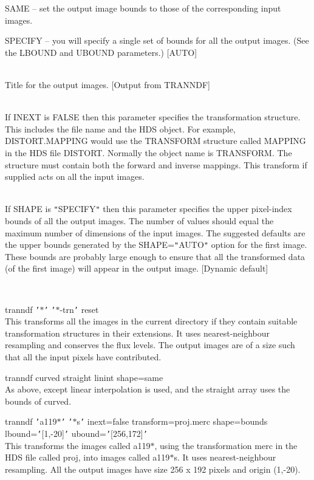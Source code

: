 \documentclass[twoside,11pt]{article}
\renewcommand{\_}{\texttt{\symbol{95}}}
\newcommand{\qt}[1]{{\tt "}#1{\tt "}}
\newcommand{\qs}[1]{{\tt '}#1{\tt '}}
\newcommand{\sstexamples}[1]{
   \item[Examples:] \mbox{} \\
   \vspace{-3.5ex}
   \begin{description}
      #1
   \end{description}
}
\newcommand{\sstsubsection}[1]{ \item[{#1}] \mbox{} \\}
\newcommand{\sstexamplesubsection}[2]{\sloppy \item{\ssttt #1} \mbox{} \\ #2 }
\newcommand{\sstnotes}[1]{\item[Notes:] \mbox{} \\[1.3ex] #1}
\newcommand{\sstitemlist}[1]{
  \mbox{} \\
  \vspace{-3.5ex}
  \begin{itemize}
     #1
  \end{itemize}
}
\newcommand{\sstitem}{\item}
\newcommand{\sstexamples}[1]{
      \item[Examples:] \\
      \begin{description}
         #1
      \end{description}
      \\
   }
\newcommand{\sstsubsection}[1]{\item[{#1}]}
\newcommand{\sstexamplesubsection}[2]{\item[{\ssttt #1}] #2}
\newcommand{\sstnotes}[1]{\item[Notes:] #1 }
\newcommand{\sstitemlist}[1]{
      \begin{itemize}
         #1
      \end{itemize}
      \\
   }
\newcommand{\sstitem}{\item}
\begin{document}
{{{{            \sstitem
               SAME    -- set the output image bounds to those of the
                            corresponding input images.

            \sstitem
               SPECIFY -- you will specify a single set of bounds for
                            all the output images. (See the LBOUND and UBOUND
                            parameters.)
            [AUTO]
         }
      }
      \sstsubsection{
         TITLE = LITERAL (Read)
      }{
         Title for the output images.
         [Output from TRANNDF]
      }
      \sstsubsection{
         TRANSFORM = TRN (Read)
      }{
         If INEXT is FALSE then this parameter specifies the
         transformation structure.  This includes the file name and the
         HDS object.  For example, DISTORT.MAPPING would use the
         TRANSFORM structure called MAPPING in the HDS file DISTORT.
         Normally the object name is TRANSFORM.  The structure must
         contain both the forward and inverse mappings. This transform
         if supplied acts on all the input images.
      }
      \sstsubsection{
         UBOUND() = \_INTEGER (Read)
      }{
         If SHAPE is \qt{SPECIFY} then this parameter specifies the upper
         pixel-index bounds of all the output images. The number of
         values should equal the maximum number of dimensions of the
         input images. The suggested defaults are the upper bounds
         generated by the SHAPE=\qt{AUTO} option for the first image. These
         bounds are probably large enough to ensure that all the
         transformed data (of the first image) will appear in the output
         image.
         [Dynamic default]
      }
   }
   \sstexamples{
      \sstexamplesubsection{
         tranndf \qs{$*$} \qs{$*$-trn} reset
      }{
         This transforms all the images in the current directory if
         they contain suitable transformation structures in their
         extensions. It uses nearest-neighbour resampling and conserves
         the flux levels. The output images are of a size such that all
         the input pixels have contributed.
      }
      \sstexamplesubsection{
         tranndf curved straight linint shape=same
      }{
         As above, except linear interpolation is used, and the straight
         array uses the bounds of curved.
      }
      \sstexamplesubsection{
         tranndf \qs{a119$*$} \qs{$*$s} inext=false transform=proj.merc
            shape=bounds lbound=\qs{[1,-20]} ubound=\qs{[256,172]}
      }{
         This transforms the images called a119$*$, using the transformation
         merc in the HDS file called proj, into images called a119$*$s.
         It uses nearest-neighbour resampling.  All the output images
         have size 256 x 192 pixels and origin (1,-20).
      }
   }
   \sstnotes{
      \sstitemlist{

}}}
\end{document}
